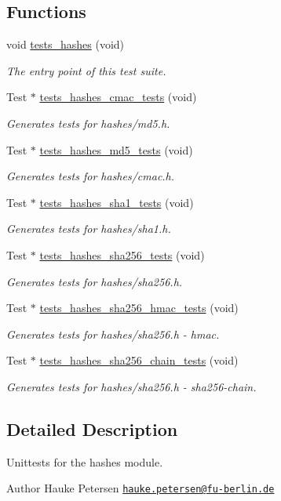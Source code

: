 \subsection*{Functions}
\begin{DoxyCompactItemize}
\item 
void \hyperlink{group__unittests_gac9c042435ff4e2597166100b86226d2a}{tests\+\_\+hashes} (void)
\begin{DoxyCompactList}\small\item\em The entry point of this test suite. \end{DoxyCompactList}\item 
Test $\ast$ \hyperlink{group__unittests_ga1a28ef20665a197204a84eb23688d340}{tests\+\_\+hashes\+\_\+cmac\+\_\+tests} (void)
\begin{DoxyCompactList}\small\item\em Generates tests for hashes/md5.\+h. \end{DoxyCompactList}\item 
Test $\ast$ \hyperlink{group__unittests_ga256959a65e4f795eac3581259fb3e48a}{tests\+\_\+hashes\+\_\+md5\+\_\+tests} (void)
\begin{DoxyCompactList}\small\item\em Generates tests for hashes/cmac.\+h. \end{DoxyCompactList}\item 
Test $\ast$ \hyperlink{group__unittests_ga5567d66422cdc40775eeacf6fa796893}{tests\+\_\+hashes\+\_\+sha1\+\_\+tests} (void)
\begin{DoxyCompactList}\small\item\em Generates tests for hashes/sha1.\+h. \end{DoxyCompactList}\item 
Test $\ast$ \hyperlink{group__unittests_ga8bd7d0c07950195a3b10d69ec62d0be2}{tests\+\_\+hashes\+\_\+sha256\+\_\+tests} (void)
\begin{DoxyCompactList}\small\item\em Generates tests for hashes/sha256.\+h. \end{DoxyCompactList}\item 
Test $\ast$ \hyperlink{group__unittests_ga7a35b0db09ca01c1e2567b95bcd06227}{tests\+\_\+hashes\+\_\+sha256\+\_\+hmac\+\_\+tests} (void)
\begin{DoxyCompactList}\small\item\em Generates tests for hashes/sha256.\+h -\/ hmac. \end{DoxyCompactList}\item 
Test $\ast$ \hyperlink{group__unittests_ga31217f1c8fb68025a8a9a17e1a9359b3}{tests\+\_\+hashes\+\_\+sha256\+\_\+chain\+\_\+tests} (void)
\begin{DoxyCompactList}\small\item\em Generates tests for hashes/sha256.\+h -\/ sha256-\/chain. \end{DoxyCompactList}\end{DoxyCompactItemize}


\subsection{Detailed Description}
Unittests for the {\ttfamily hashes} module. 

\begin{DoxyAuthor}{Author}
Hauke Petersen \href{mailto:hauke.petersen@fu-berlin.de}{\tt hauke.\+petersen@fu-\/berlin.\+de} 
\end{DoxyAuthor}
